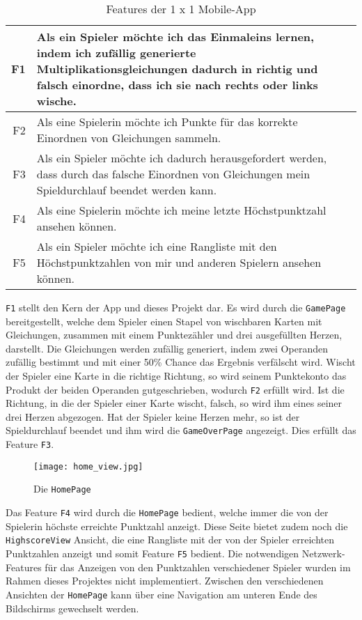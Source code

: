 \begin{table}[ht]
  \begin{tabu}{| >{\ttfamily} r | X |}
    \hline
    F1 & Als ein Spieler möchte ich das Einmaleins lernen, indem ich zufällig generierte Multiplikationsgleichungen dadurch in richtig und falsch einordne, dass ich sie nach rechts oder links wische.\\
    \hline
    F2 & Als eine Spielerin möchte ich Punkte für das korrekte Einordnen von Gleichungen sammeln.\\
    \hline
    F3 & Als ein Spieler möchte ich dadurch herausgefordert werden, dass durch das falsche Einordnen von Gleichungen mein Spieldurchlauf beendet werden kann.\\
    \hline
    F4 & Als eine Spielerin möchte ich meine letzte Höchstpunktzahl ansehen können.\\
    \hline
    F5 & Als ein Spieler möchte ich eine Rangliste mit den Höchstpunktzahlen von mir und anderen Spielern ansehen können.\\
    \hline
  \end{tabu}
  \caption{Features der 1 x 1 Mobile-App}\label{tab:features}
\end{table}

\texttt{F1} stellt den Kern der App und dieses Projekt dar.
Es wird durch die \texttt{GamePage} bereitgestellt, welche dem Spieler einen Stapel von wischbaren Karten mit Gleichungen, zusammen mit einem Punktezähler und drei ausgefüllten Herzen, darstellt.
Die Gleichungen werden zufällig generiert, indem zwei Operanden zufällig bestimmt und mit einer 50\% Chance das Ergebnis verfälscht wird.
Wischt der Spieler eine Karte in die richtige Richtung, so wird seinem Punktekonto das Produkt der beiden Operanden gutgeschrieben, wodurch \texttt{F2} erfüllt wird.
Ist die Richtung, in die der Spieler einer Karte wischt, falsch, so wird ihm eines seiner drei Herzen abgezogen.
Hat der Spieler keine Herzen mehr, so ist der Spieldurchlauf beendet und ihm wird die \texttt{GameOverPage} angezeigt.
Dies erfüllt das Feature \texttt{F3}.

\begin{wrapfigure}{l}{0.4\textwidth}
  \centering
  \texttt{[image: home\_view.jpg]}
  \caption{Die \texttt{HomePage}}
\end{wrapfigure}

Das Feature \texttt{F4} wird durch die \texttt{HomePage} bedient, welche immer die von der Spielerin höchste erreichte Punktzahl anzeigt.
Diese Seite bietet zudem noch die \texttt{HighscoreView} Ansicht, die eine Rangliste mit der von der Spieler erreichten Punktzahlen anzeigt und somit Feature \texttt{F5} bedient.
Die notwendigen Netzwerk-Features für das Anzeigen von den Punktzahlen verschiedener Spieler wurden im Rahmen dieses Projektes nicht implementiert.
Zwischen den verschiedenen Ansichten der \texttt{HomePage} kann über eine Navigation am unteren Ende des Bildschirms gewechselt werden.

